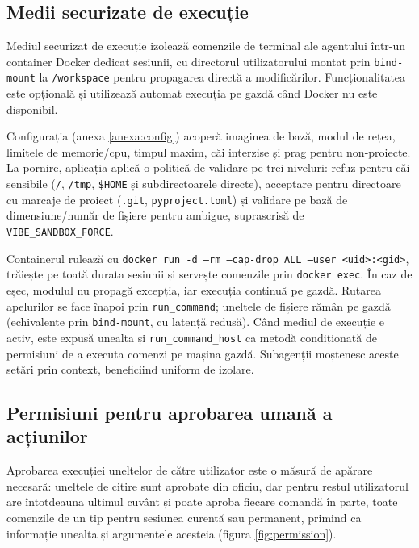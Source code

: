 \documentclass[12pt, a4paper, oneside, romanian]{teza-upb}
\begin{document}
    \subsection{Medii securizate de execuție}

    Mediul securizat de execuție izolează comenzile de terminal ale agentului într-un container Docker dedicat sesiunii, cu directorul utilizatorului montat prin \texttt{bind-mount} la \texttt{/workspace} pentru propagarea directă a modificărilor. Funcționalitatea este opțională și utilizează automat execuția pe gazdă când Docker nu este disponibil.

    Configurația (anexa \ref{anexa:config}) acoperă imaginea de bază, modul de rețea, limitele de memorie/\ac{cpu}, timpul maxim, căi interzise și prag pentru non-proiecte. La pornire, aplicația aplică o politică de validare pe trei niveluri: refuz pentru căi sensibile (\texttt{/}, \texttt{/tmp}, \texttt{\$HOME} și subdirectoarele directe), acceptare pentru directoare cu marcaje de proiect (\texttt{.git}, \texttt{pyproject.toml}) și validare pe bază de dimensiune/număr de fișiere pentru ambigue, suprascrisă de \texttt{VIBE\_SANDBOX\_FORCE}.

    Containerul rulează cu \texttt{docker run -d --rm --cap-drop ALL --user <uid>:<gid>}, trăiește pe toată durata sesiunii și servește comenzile prin \texttt{docker exec}. În caz de eșec, modulul nu propagă excepția, iar execuția continuă pe gazdă. Rutarea apelurilor se face înapoi prin \texttt{run\_command}; uneltele de fișiere rămân pe gazdă (echivalente prin \texttt{bind-mount}, cu latență redusă). Când mediul de execuție e activ, este expusă unealta și \texttt{run\_command\_host} ca metodă condiționată de permisiuni de a executa comenzi pe mașina gazdă. Subagenții moștenesc aceste setări prin context, beneficiind uniform de izolare. 

    \subsection{Permisiuni pentru aprobarea umană a acțiunilor}

    Aprobarea execuției uneltelor de către utilizator este o măsură de apărare necesară: uneltele de citire sunt aprobate din oficiu, dar pentru restul utilizatorul are întotdeauna ultimul cuvânt și poate aproba fiecare comandă în parte, toate comenzile de un tip pentru sesiunea curentă sau permanent, primind ca informație unealta și argumentele acesteia (figura \ref{fig:permission}).
\end{document}

